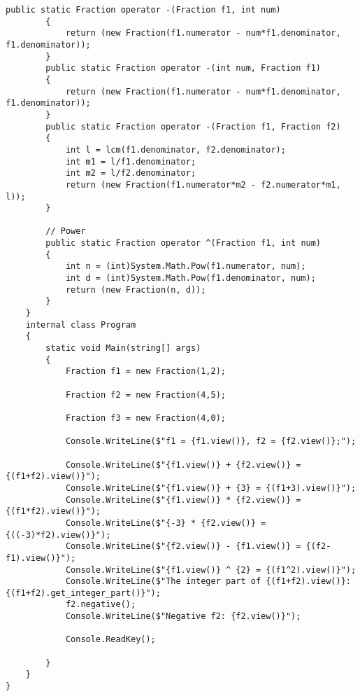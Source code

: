 \begin{lstlisting}[language={[Sharp]C}]
        public static Fraction operator -(Fraction f1, int num)
        {
            return (new Fraction(f1.numerator - num*f1.denominator, f1.denominator));
        }
        public static Fraction operator -(int num, Fraction f1)
        {
            return (new Fraction(f1.numerator - num*f1.denominator, f1.denominator));
        }
        public static Fraction operator -(Fraction f1, Fraction f2)
        {
            int l = lcm(f1.denominator, f2.denominator);
            int m1 = l/f1.denominator;
            int m2 = l/f2.denominator;
            return (new Fraction(f1.numerator*m2 - f2.numerator*m1, l));
        }
        
        // Power 
        public static Fraction operator ^(Fraction f1, int num)
        {
            int n = (int)System.Math.Pow(f1.numerator, num);
            int d = (int)System.Math.Pow(f1.denominator, num);
            return (new Fraction(n, d));
        }
    }
    internal class Program
    {
        static void Main(string[] args)
        {
            Fraction f1 = new Fraction(1,2);

            Fraction f2 = new Fraction(4,5);

            Fraction f3 = new Fraction(4,0);

            Console.WriteLine($"f1 = {f1.view()}, f2 = {f2.view()};");

            Console.WriteLine($"{f1.view()} + {f2.view()} = {(f1+f2).view()}");
            Console.WriteLine($"{f1.view()} + {3} = {(f1+3).view()}");
            Console.WriteLine($"{f1.view()} * {f2.view()} = {(f1*f2).view()}");
            Console.WriteLine($"{-3} * {f2.view()} = {((-3)*f2).view()}");
            Console.WriteLine($"{f2.view()} - {f1.view()} = {(f2-f1).view()}");
            Console.WriteLine($"{f1.view()} ^ {2} = {(f1^2).view()}");
            Console.WriteLine($"The integer part of {(f1+f2).view()}: {(f1+f2).get_integer_part()}");
            f2.negative();
            Console.WriteLine($"Negative f2: {f2.view()}");

            Console.ReadKey();

        }
    }
}

\end{lstlisting}